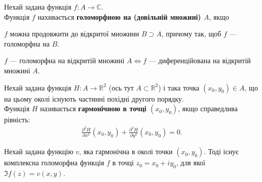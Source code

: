\documentclass{math_library}
\begin{document}
\begin{definition}
Нехай задана функція $f \colon A \to \mathbb{C}$.\\
Функція $f$ нахивається \textbf{голоморфною на (довільній множині) $A$}, якщо
\begin{center}
$f$ можна продовжити до відкритої множини $B \supset A$, причому так, щоб $f$ --- голоморфна на $B$.
\end{center}
\end{definition}

\begin{remark}
$f$ --- голоморфна на відкритій множині $A \iff f$ --- диференційована на відкритій множині $A$. 
\end{remark}

\begin{definition}
Нехай задана функція $H \colon A \rightarrow \mathbb{R}^2$ (ось тут $A \subset \mathbb{R}^2$) і така точка $(x_0,y_0) \in A$, що на цьому околі існують частинні похідні другого порядку.\\
Функція $H$ називається \textbf{гармонічною в точці $(x_0,y_0)$}, якщо справедлива рівність:
\begin{align*}
\frac{\partial^2 H}{\partial x^2}(x_0,y_0) + \frac{\partial^2 H}{\partial y^2}(x_0,y_0) = 0.
\end{align*}
\end{definition}

\begin{theorem}
Нехай задана функцію $v$, яка гармонічна в околі точки $(x_0,y_0)$. Тоді існує комплексна голоморфна функція $f$ в точці $z_0 = x_0 + iy_0$, для якої $\Im f(z) = v(x,y)$.

\end{theorem}
\end{document}
